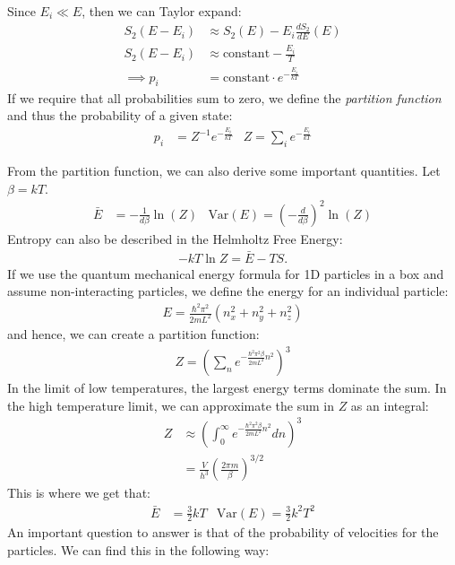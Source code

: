 \documentclass{article}
\begin{document}
Since $E_i \ll E$, then we can Taylor expand:
\begin{align*}
  S_2(E - E_i) &\approx S_2(E) - E_i \frac{dS_2}{dE}(E)\\
  S_2(E - E_i) &\approx \text{constant} - \frac{E_i}{T}\\
  \implies p_i &= \text{constant} \cdot e^{-\frac{E_i}{kT}}
\end{align*}
If we require that all probabilities sum to zero, we define the \textit{partition function} and thus the probability of a given state:
\begin{align*}
  p_i &= Z^{-1}e^{-\frac{E_i}{kT}} & Z = \sum_{i} e^{-\frac{E_i}{kT}}
\end{align*}

From the partition function, we can also derive some important quantities. Let $\beta = kT$.
\begin{align*}
  \bar{E} &= -\frac{1}{d\beta}\ln(Z) & \text{Var}(E) = \left( - \frac{d}{d\beta}\right)^2 \ln(Z)
\end{align*}
Entropy can also be described in the Helmholtz Free Energy:
\begin{align*}
  -kT \ln Z = \bar{E} - TS.
\end{align*}
If we use the quantum mechanical energy formula for 1D particles in a box and assume non-interacting particles, we define the energy for an individual particle:
\begin{align*}
  E = \frac{\hbar^2\pi^2}{2mL^2}(n_x^2 + n_y^2 + n_z^2)
\end{align*}
and hence, we can create a partition function:
\begin{align*}
  Z = \left(\sum_{n}e^{-\frac{\hbar^2\pi^2\beta}{2mL^2}n^2}\right)^3
\end{align*}
In the limit of low temperatures, the largest energy terms dominate the sum. In the high temperature limit, we can approximate the sum in $Z$ as an integral:
\begin{align*}
  Z &\approx \left( \int_{0}^{\infty} e^{-\frac{\hbar^2\pi^2\beta}{2mL^2}n^2} dn \right)^3\\
  &= \frac{V}{h^3} \left( \frac{2\pi m}{\beta}\right)^{3/2}
\end{align*}
This is where we get that:
\begin{align*}
  \bar{E} &= \frac{3}{2}kT & \text{Var}(E) = \frac{3}{2}k^2T^2
\end{align*}
An important question to answer is that of the probability of velocities for the particles. We can find this in the following way:
\end{document}
